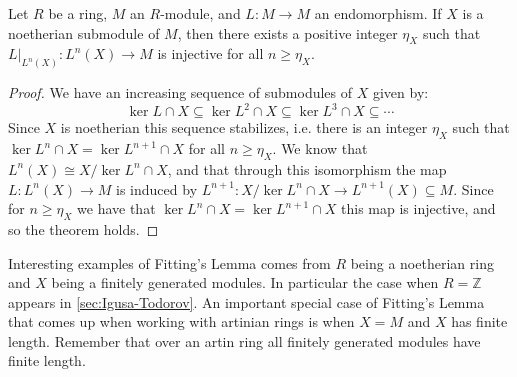 \begin{theorem}\label{thm:Fittings_lemma}
	Let $R$ be a ring, $M$ an $R$-module, and $L\colon M \to M$ an endomorphism. If $X$ is a noetherian submodule of $M$, then there exists a positive integer $\eta_X$ such that $L|_{L^n(X)}\colon L^n(X) \to M$ is injective for all $n \geq \eta_X$.
	\begin{proof}
		We have an increasing sequence of submodules of $X$ given by:
		$$\ker L \cap X \subseteq \ker L^2 \cap X \subseteq \ker L^3 \cap X \subseteq \cdots$$
		Since $X$ is noetherian this sequence stabilizes, i.e. there is an integer $\eta_X$ such that $\ker L^n \cap X = \ker L^{n+1} \cap X$ for all $n \geq \eta_X$. We know that $L^n(X) \cong X / \ker L^n \cap X$, and that through this isomorphism the map $L \colon L^n(X) \to M$ is induced by $L^{n+1} \colon X / \ker L^n \cap X \to L^{n+1}(X) \subseteq M$. Since for $n \geq \eta_X$ we have that $\ker L^n \cap X = \ker L^{n+1}\cap X$ this map is injective, and so the theorem holds.
	\end{proof}
\end{theorem}

Interesting examples of Fitting's Lemma comes from $R$ being a noetherian ring and $X$ being a finitely generated modules. In particular the case when $R = \mathbb Z$ appears in \cref{sec:Igusa-Todorov}. An important special case of Fitting's Lemma that comes up when working with artinian rings is when $X=M$ and $X$ has finite length. Remember that over an artin ring all finitely generated modules have finite length.

